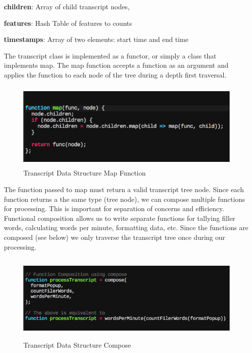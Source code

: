 \textbf{children}: Array of child transcript nodes,

\textbf{features}: Hash Table of features to counts

\textbf{timestamps}: Array of two elements: start time and end time

The transcript class is implemented as a functor, or simply a class that
implements map. The map function accepts a function as an argument and applies
the function to each node of the tree during a depth first traversal.

\begin{figure}[H]
  \centering
   \includegraphics[height=1.7in]{figures/functor}
   \caption{Transcript Data Structure Map Function}
\end{figure}

The function passed to map must return a valid transcript tree node. Since each
function returns a the same type (tree node), we can compose multiple functions
for processing. This is important for separation of concerns and efficiency.
Functional composition allows us to write separate functions for tallying filler
words, calculating words per minute, formatting data, etc. Since the functions
are composed (see below) we only traverse the transcript tree once during our
processing.

% 


\begin{figure}[H]
  \centering
   \includegraphics[height=1.7in]{figures/compose}
   \caption{Transcript Data Structure Compose}
\end{figure}

